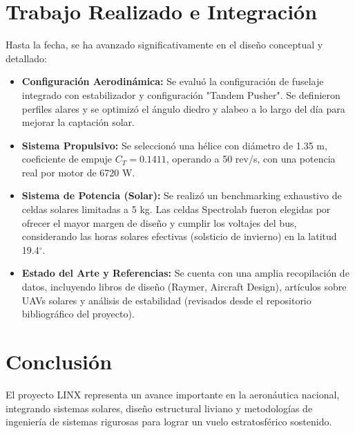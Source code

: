 \documentclass[12pt,a4paper]{article}
\begin{document}
\section{Trabajo Realizado e Integración}
Hasta la fecha, se ha avanzado significativamente en el diseño conceptual y detallado:
\begin{itemize}
    \item \textbf{Configuración Aerodinámica:} Se evaluó la configuración de fuselaje integrado con estabilizador y configuración "Tandem Pusher". Se definieron perfiles alares y se optimizó el ángulo diedro y alabeo a lo largo del día para mejorar la captación solar.
    \item \textbf{Sistema Propulsivo:} Se seleccionó una hélice con diámetro de 1.35 m, coeficiente de empuje $C_T=0.1411$, operando a 50 rev/s, con una potencia real por motor de 6720 W.
    \item \textbf{Sistema de Potencia (Solar):} Se realizó un benchmarking exhaustivo de celdas solares limitadas a 5 kg. Las celdas Spectrolab fueron elegidas por ofrecer el mayor margen de diseño y cumplir los voltajes del bus, considerando las horas solares efectivas (solsticio de invierno) en la latitud 19.4$^\circ$.
    \item \textbf{Estado del Arte y Referencias:} Se cuenta con una amplia recopilación de datos, incluyendo libros de diseño (Raymer, Aircraft Design), artículos sobre UAVs solares y análisis de estabilidad (revisados desde el repositorio bibliográfico del proyecto).
\end{itemize}

\section{Conclusión}
El proyecto LINX representa un avance importante en la aeronáutica nacional, integrando sistemas solares, diseño estructural liviano y metodologías de ingeniería de sistemas rigurosas para lograr un vuelo estratosférico sostenido.
\end{document}

